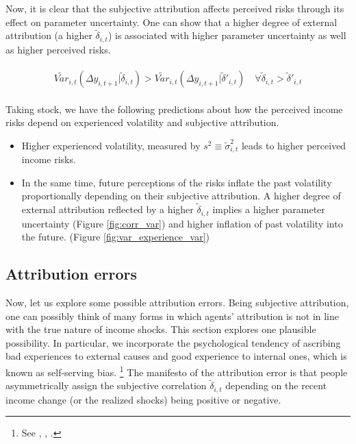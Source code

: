 \documentclass[12pt,notitlepage,onecolumn,aps,pra]{article}
\begin{document}
Now, it is clear that the subjective attribution affects perceived risks
through its effect on parameter uncertainty. One can show that a higher
degree of external attribution (a higher \(\tilde \delta_{i,t}\)) is
associated with higher parameter uncertainty as well as higher perceived
risks.

\begin{eqnarray}
\begin{split}
\tilde {Var}_{i,t}(\Delta y_{i,t+1}|\tilde \delta_{i,t}) >  \tilde {Var}_{i,t}(\Delta y_{i,t+1}|\tilde \delta'_{i,t}) \quad \forall \tilde \delta_{i,t} > \tilde \delta'_{i,t}
\end{split}
\end{eqnarray}

Taking stock, we have the following predictions about how the perceived
income risks depend on experienced volatility and subjective
attribution.

\begin{itemize}
\item
  Higher experienced volatility, measured by
  \(s^2 \equiv \tilde{\sigma}^2_{i,t}\) leads to higher perceived income
  risks.
\item
  In the same time, future perceptions of the risks inflate the past
  volatility proportionally depending on their subjective attribution. A
  higher degree of external attribution reflected by a higher
  \(\tilde \delta_{i,t}\) implies a higher parameter uncertainty (Figure
  \ref{fig:corr_var}) and higher inflation of past volatility into the
  future. (Figure \ref{fig:var_experience_var})
\end{itemize}



    \hypertarget{attribution-errors}{%
\subsection{Attribution errors}\label{attribution-errors}}

Now, let us explore some possible attribution errors. Being subjective
attribution, one can possibly think of many forms in which agents'
attribution is not in line with the true nature of income shocks. This
section explores one plausible possibility. In particular, we
incorporate the psychological tendency of ascribing bad experiences to
external causes and good experience to internal ones, which is known as
self-serving bias.
\footnote{See \cite{al1993attributional}, \cite{campbell1999self}, \cite{seidel2010blame}.}
The manifesto of the attribution error is that people asymmetrically
assign the subjective correlation \(\tilde \delta_{i,t}\) depending on
the recent income change (or the realized shocks) being positive or
negative.
\end{document}
